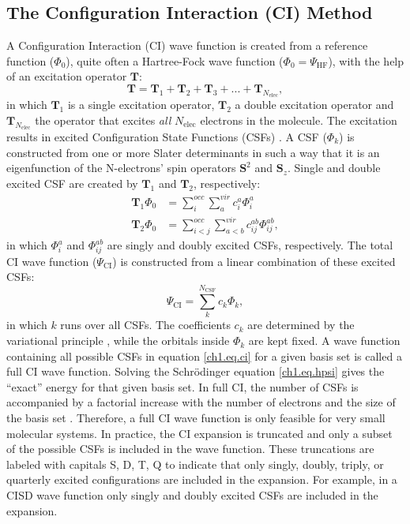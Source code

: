 \subsection{\label{ch1.sec.ci}The Configuration Interaction (CI) Method}

A Configuration Interaction (CI) wave function is created from a reference function ($\Phi_0$), quite often a Hartree-Fock wave function ($\Phi_0 = \Psi_\mathrm{HF}$), with the help of an excitation operator $\mathbf{T}$:
\begin{equation}
\mathbf{T}=\mathbf{T}_1 + \mathbf{T}_2 + \mathbf{T}_3 + ... + \mathbf{T}_{N_{\mathrm{elec}}},
\label{ch1.eq.ciexcitation}
\end{equation}
in which $\mathbf{T}_1$ is a single excitation operator, $\mathbf{T}_2$ a double excitation operator and $\mathbf{T}_{N_{\mathrm{elec}}}$ the operator that excites \textit{all} $N_{\mathrm{elec}}$ electrons in the molecule. The excitation results in excited Configuration State Functions (CSFs) \cite{shavitt1,shavitt2}. A CSF ($\Phi_k$) is constructed from one or more Slater determinants in such a way that it is an eigenfunction of the N-electrons' spin operators $\mathbf{S}^2$ and $\mathbf{S}_z$. Single and double excited CSF are created by $\mathbf{T}_1$ and $\mathbf{T}_2$, respectively:
\begin{equation}
\begin{split}
\mathbf{T}_1 \Phi_0 & = \sum_i^{occ} \sum_a^{vir} c_i^a \Phi_i^a \\
\mathbf{T}_2 \Phi_0 & = \sum_{i<j}^{occ} \sum_{a<b}^{vir} c_{ij}^{ab} \Phi_{ij}^{ab},
\end{split}
\label{ch1.eq.ciexcited}
\end{equation}
in which $\Phi_i^a$ and $\Phi_{ij}^{ab}$ are singly and doubly excited CSFs, respectively. The total CI wave function ($\Psi_{\mathrm{CI}}$) is constructed from a linear combination of these excited CSFs:
\begin{equation}
\Psi_{\mathrm{CI}} = \sum_{k}^{N_{\mathrm{CSF}}} c_k \Phi_k,
\label{ch1.eq.ci}
\end{equation}
in which $k$ runs over all CSFs. The coefficients $c_k$ are determined by the variational principle \cite{varia}, while the orbitals inside $\Phi_k$ are kept fixed. A wave function containing all possible CSFs in equation \ref{ch1.eq.ci} for a given basis set is called a full CI wave function. Solving the Schr\"{o}dinger equation \ref{ch1.eq.hpsi} gives the ``exact'' energy for that given basis set. In full CI, the number of CSFs is accompanied by a factorial increase with the number of electrons and the size of the basis set \cite{weyl}. Therefore, a full CI wave function is only feasible for very small molecular systems. In practice, the CI expansion is truncated and only a subset of the possible CSFs is included in the wave function. These truncations are labeled with capitals S, D, T, Q to indicate that only singly, doubly, triply, or quarterly excited configurations are included in the expansion. For example, in a CISD wave function only singly and doubly excited CSFs are included in the expansion.

